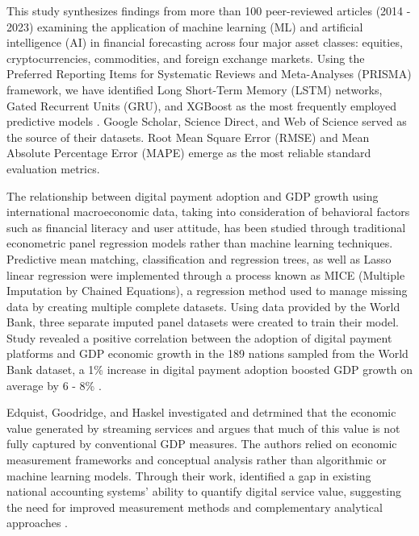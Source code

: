 \documentclass[12pt]{article}
\begin{document}
        
        This study synthesizes findings from more than 100 peer-reviewed articles (2014 - 2023) examining the application of machine learning (ML) and artificial intelligence (AI) in financial forecasting across four major asset classes: equities, cryptocurrencies, commodities, and foreign exchange markets. Using the Preferred Reporting Items for Systematic Reviews and Meta-Analyses (PRISMA) framework, we have identified Long Short-Term Memory (LSTM) networks, Gated Recurrent Units (GRU), and XGBoost as the most frequently employed predictive models \cite{Vanscura2025}. Google Scholar, Science Direct, and Web of Science served as the source of their datasets. Root Mean Square Error (RMSE) and Mean Absolute Percentage Error (MAPE) emerge as the most reliable standard evaluation metrics. 

        The relationship between digital payment adoption and GDP growth using international macroeconomic data, taking into consideration of behavioral factors such as financial literacy and user attitude, has been studied through traditional econometric panel regression models rather than machine learning techniques. Predictive mean matching, classification and regression trees, as well as Lasso linear regression were implemented through a process known as MICE (Multiple Imputation by Chained Equations), a regression method used to manage missing data by creating multiple complete datasets. Using data provided by the World Bank, three separate imputed panel datasets were created to train their model. Study revealed a positive correlation between the adoption of digital payment platforms and GDP economic growth in the 189 nations sampled from the World Bank dataset, a 1\% increase in digital payment adoption boosted GDP growth on average by 6 - 8\% \cite{BIRIGOZZI2025102768}.

        Edquist, Goodridge, and Haskel investigated and detrmined that the economic value generated by streaming services and argues that much of this value is not fully captured by conventional GDP measures. The authors relied on economic measurement frameworks and conceptual analysis rather than algorithmic or machine learning models. Through their work, identified a gap in existing national accounting systems’ ability to quantify digital service value, suggesting the need for improved measurement methods and complementary analytical approaches \cite{Edquist12032022}.
\end{document}
